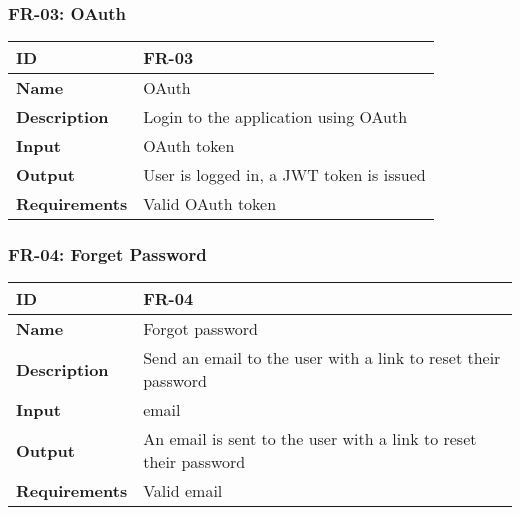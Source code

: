 \subsubsection{FR-03: OAuth}
\begin{center}
  \begin{tabularx}{\textwidth}{|l|X|}
      \hline
      \textbf{ID} & FR-03 \\
      \hline
      \textbf{Name} & OAuth \\
      \hline
      \textbf{Description} & Login to the application using OAuth \\
      \hline
      \textbf{Input} & OAuth token \\
      \hline
      \textbf{Output} & User is logged in, a JWT token is issued \\
      \hline
      \textbf{Requirements} & Valid OAuth token \\
      \hline
  \end{tabularx}
\end{center}

\subsubsection{FR-04: Forget Password}
\begin{center}
  \begin{tabularx}{\textwidth}{|l|X|}
      \hline
      \textbf{ID} & FR-04 \\
      \hline
      \textbf{Name} & Forgot password \\
      \hline
      \textbf{Description} & Send an email to the user with a link to reset their password \\
      \hline
      \textbf{Input} & email \\
      \hline
      \textbf{Output} & An email is sent to the user with a link to reset their password \\
      \hline
      \textbf{Requirements} & Valid email \\
      \hline
  \end{tabularx}
\end{center}
\newpage

